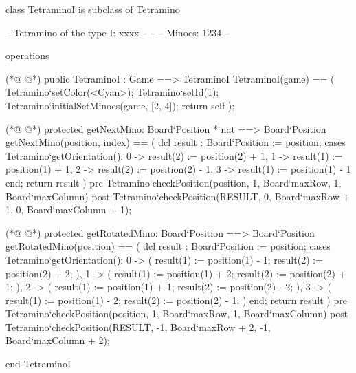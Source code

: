 \begin{vdmpp}[breaklines=true]
class TetraminoI is subclass of Tetramino

 -- Tetramino of the type I: xxxx
 -- 
 --
 -- Minoes:         1234
 -- 
 
  
 operations
 
(*@
\label{TetraminoI:12}
@*)
  public TetraminoI : Game ==> TetraminoI
  TetraminoI(game) == (
   Tetramino`setColor(<Cyan>);
   Tetramino`setId(1);
   Tetramino`initialSetMinoes(game, [2, 4]);
   return self
  );
  
(*@
\label{getNextMino:20}
@*)
  protected getNextMino: Board`Position * nat ==> Board`Position
  getNextMino(position, index) == (
   dcl result : Board`Position := position;
   cases Tetramino`getOrientation():
    0 -> result(2) := position(2) + 1,
    1 -> result(1) := position(1) + 1,
    2 -> result(2) := position(2) - 1,
    3 -> result(1) := position(1) - 1
   end;
   return result
  )
  pre Tetramino`checkPosition(position, 1, Board`maxRow, 1, Board`maxColumn)
  post Tetramino`checkPosition(RESULT, 0, Board`maxRow + 1, 0, Board`maxColumn + 1);
  
(*@
\label{getRotatedMino:34}
@*)
  protected getRotatedMino: Board`Position ==> Board`Position
  getRotatedMino(position) == (
   dcl result : Board`Position := position;
   cases Tetramino`getOrientation():
    0 -> (
     result(1) := position(1) - 1; 
     result(2) := position(2) + 2;
     ),
    1 -> (
     result(1) := position(1) + 2; 
     result(2) := position(2) + 1;
     ),
    2 -> (
     result(1) := position(1) + 1; 
     result(2) := position(2) - 2;
     ),
    3 -> (
     result(1) := position(1) - 2; 
     result(2) := position(2) - 1;
     )
   end;
   return result
  )
  pre Tetramino`checkPosition(position, 1, Board`maxRow, 1, Board`maxColumn)
  post Tetramino`checkPosition(RESULT, -1, Board`maxRow + 2, -1, Board`maxColumn + 2); 
  
      
end TetraminoI
\end{vdmpp}
